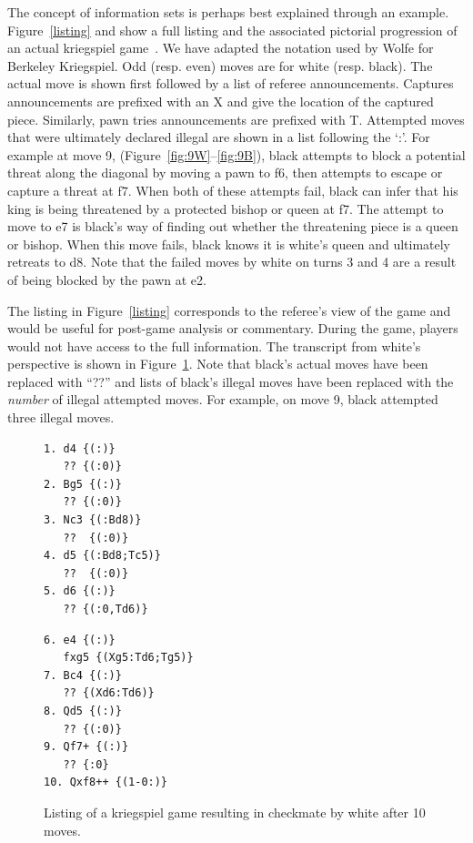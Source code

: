 \documentclass[times, 10pt,twocolumn]{article}
\begin{document}
The concept of information sets is perhaps best explained through an example. 
Figure~\ref{listing} and show a full listing and the associated pictorial progression of an actual
kriegspiel game~\cite{li94chess}.  We have adapted the notation used by Wolfe for Berkeley Kriegspiel.  Odd (resp. even) moves are for white (resp. black).  The actual move is shown
first followed by a list of referee announcements.  Captures announcements are prefixed with an X and give the location
of the captured piece.  Similarly, pawn tries announcements are prefixed with T.  Attempted moves that were ultimately
declared illegal are shown in a list following the `:'.  For example at move 9, (Figure~\ref{fig:9W}--\ref{fig:9B}),
black attempts to block a potential threat along the diagonal by moving a pawn to f6, then attempts to escape or capture
a threat at f7.  When both of these attempts fail, black can infer that his king is being threatened by a protected
bishop or queen at f7.  The attempt to move to e7 is black's way of finding out whether the threatening piece is a queen
or bishop.  When this move fails, black knows it is white's queen and ultimately retreats to d8.  Note that the failed
moves by white on turns 3 and 4 are a result of being blocked by the pawn at e2.


The listing in Figure~\ref{listing} corresponds to the referee's view of the game and would be useful for
post-game analysis or commentary.  During the game, players would not have access to the full information.  The
transcript from white's perspective is shown in Figure~\ref{filteredlisting}.  Note that black's actual moves have been
replaced with ``??'' and lists of black's illegal moves have been replaced with the {\em number} of illegal attempted
moves.  For example, on move 9, black attempted three illegal moves.
\begin{figure}
\begin{minipage}[b]{0.35\linewidth}
\centering
\small
\begin{verbatim}
1. d4 {(:)}
   ?? {(:0)}
2. Bg5 {(:)}
   ?? {(:0)}
3. Nc3 {(:Bd8)}
   ??  {(:0)}
4. d5 {(:Bd8;Tc5)}
   ??  {(:0)}
5. d6 {(:)}
   ?? {(:0,Td6)}
\end{verbatim}
\end{minipage}
\begin{minipage}[b]{0.25\linewidth}
\small
\centering
\begin{verbatim}
6. e4 {(:)}
   fxg5 {(Xg5:Td6;Tg5)}
7. Bc4 {(:)}
   ?? {(Xd6:Td6)}
8. Qd5 {(:)}
   ?? {(:0)}
9. Qf7+ {(:)} 
   ?? {:0}
10. Qxf8++ {(1-0:)}
\end{verbatim}
\end{minipage}
\vspace{-0.1in}
\caption{Listing of a kriegspiel game resulting in checkmate by white after 10 moves.}
\label{filteredlisting}
\vspace{-0.2in}
\end{figure}
\end{document}
